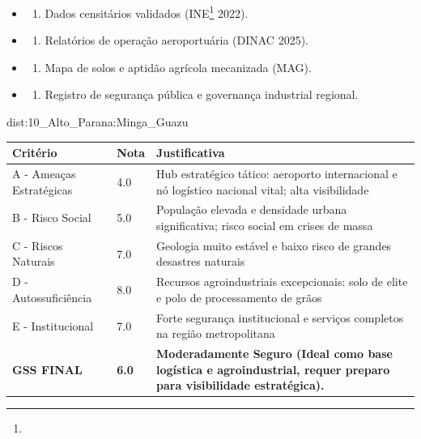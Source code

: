 {\begin{itemize}
\tightlist
\item
  \begin{enumerate}
  \def\labelenumi{\arabic{enumi})}
  \tightlist
  \item
    Dados censitários validados (INE\footnote{\fineINE} 2022).
  \end{enumerate}
\item
  \begin{enumerate}
  \def\labelenumi{\arabic{enumi})}
  \setcounter{enumi}{1}
  \tightlist
  \item
    Relatórios de operação aeroportuária (DINAC 2025).
  \end{enumerate}
\item
  \begin{enumerate}
  \def\labelenumi{\arabic{enumi})}
  \setcounter{enumi}{2}
  \tightlist
  \item
    Mapa de solos e aptidão agrícola mecanizada (MAG).
  \end{enumerate}
\item
  \begin{enumerate}
  \def\labelenumi{\arabic{enumi})}
  \setcounter{enumi}{3}
  \tightlist
  \item
    Registro de segurança pública e governança industrial regional.
  \end{enumerate}
\end{itemize}}{dist:10_Alto_Parana:Minga_Guazu}
\begin{table}[ht!]
\small \begin{tabular}{p{3.0cm}p{0.8cm}p{6.0cm}} \toprule
\textbf{Critério} & \textbf{Nota} & \textbf{Justificativa} \\ \midrule
A - Ameaças Estratégicas & 4.0 & Hub estratégico tático: aeroporto internacional e nó logístico nacional vital; alta visibilidade \\
B - Risco Social & 5.0 & População elevada e densidade urbana significativa; risco social em crises de massa \\
C - Riscos Naturais & 7.0 & Geologia muito estável e baixo risco de grandes desastres naturais \\
D - Autossuficiência & 8.0 & Recursos agroindustriais excepcionais: solo de elite e polo de processamento de grãos \\
E - Institucional & 7.0 & Forte segurança institucional e serviços completos na região metropolitana \\
\midrule \textbf{GSS FINAL} & \textbf{6.0} & \textbf{Moderadamente Seguro (Ideal como base logística e agroindustrial, requer preparo para visibilidade estratégica).} \\ \bottomrule \end{tabular}
\end{table}
